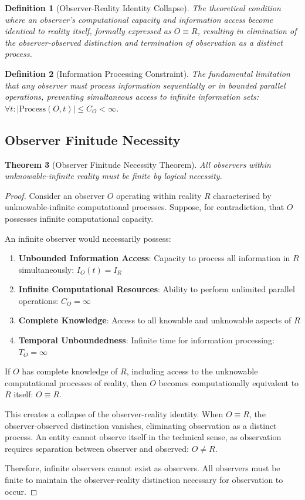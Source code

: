 \documentclass[12pt,a4paper]{article}
\newtheorem{theorem}{Theorem}[section]
\newtheorem{definition}[theorem]{Definition}
\begin{document}
\begin{definition}[Observer-Reality Identity Collapse]
The theoretical condition where an observer's computational capacity and information access become identical to reality itself, formally expressed as $O \equiv R$, resulting in elimination of the observer-observed distinction and termination of observation as a distinct process.
\end{definition}

\begin{definition}[Information Processing Constraint]
The fundamental limitation that any observer must process information sequentially or in bounded parallel operations, preventing simultaneous access to infinite information sets: $\forall t: |\text{Process}(O,t)| \leq C_O < \infty$.
\end{definition}

\subsection{Observer Finitude Necessity}

\begin{theorem}[Observer Finitude Necessity Theorem]
All observers within unknowable-infinite reality must be finite by logical necessity.
\end{theorem}

\begin{proof}
Consider an observer $O$ operating within reality $R$ characterised by unknowable-infinite computational processes. Suppose, for contradiction, that $O$ possesses infinite computational capacity.

An infinite observer would necessarily possess:
\begin{enumerate}
\item \textbf{Unbounded Information Access}: Capacity to process all information in $R$ simultaneously: $I_O(t) = I_R$
\item \textbf{Infinite Computational Resources}: Ability to perform unlimited parallel operations: $C_O = \infty$
\item \textbf{Complete Knowledge}: Access to all knowable and unknowable aspects of $R$
\item \textbf{Temporal Unboundedness}: Infinite time for information processing: $T_O = \infty$
\end{enumerate}

If $O$ has complete knowledge of $R$, including access to the unknowable computational processes of reality, then $O$ becomes computationally equivalent to $R$ itself: $O \equiv R$.

This creates a collapse of the observer-reality identity. When $O \equiv R$, the observer-observed distinction vanishes, eliminating observation as a distinct process. An entity cannot observe itself in the technical sense, as observation requires separation between observer and observed: $O \neq R$.

Therefore, infinite observers cannot exist as observers. All observers must be finite to maintain the observer-reality distinction necessary for observation to occur.
\end{proof}
\end{document}
